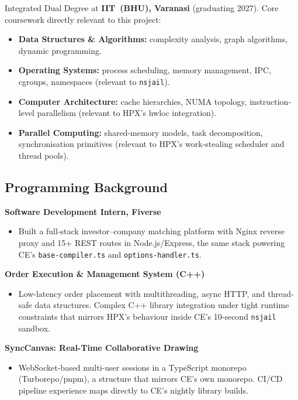 \documentclass[11pt, a4paper]{article}
\newcommand{\code}[1]{\texttt{#1}}
\newcommand{\cefile}[1]{\texttt{#1}}
\begin{document}
Integrated Dual Degree at \textbf{IIT~(BHU), Varanasi} (graduating 2027).
Core coursework directly relevant to this project:
\begin{itemize}[leftmargin=2em, itemsep=1pt]
  \item \textbf{Data Structures \& Algorithms:} complexity analysis,
        graph algorithms, dynamic programming.
  \item \textbf{Operating Systems:} process scheduling, memory management,
        IPC, cgroups, namespaces (relevant to \code{nsjail}).
  \item \textbf{Computer Architecture:} cache hierarchies, NUMA topology,
        instruction-level parallelism (relevant to HPX's hwloc integration).
  \item \textbf{Parallel Computing:} shared-memory models, task
        decomposition, synchronisation primitives (relevant to HPX's
        work-stealing scheduler and thread pools).
\end{itemize}

\subsection*{Programming Background}

\textbf{Software Development Intern, Fiverse}
\begin{itemize}[leftmargin=2em, itemsep=2pt]
  \item Built a full-stack investor--company matching platform with Nginx
        reverse proxy and 15+ REST routes in Node.js/Express, the same
        stack powering CE's \cefile{base-compiler.ts} and
        \cefile{options-handler.ts}.
\end{itemize}

\textbf{Order Execution \& Management System (C++)}
\begin{itemize}[leftmargin=2em, itemsep=2pt]
  \item Low-latency order placement with multithreading, async HTTP,
        and thread-safe data structures. Complex C++ library integration
        under tight runtime constraints that mirrors HPX's behaviour inside
        CE's 10-second \code{nsjail} sandbox.
\end{itemize}

\textbf{SyncCanvas: Real-Time Collaborative Drawing}
\begin{itemize}[leftmargin=2em, itemsep=2pt]
  \item WebSocket-based multi-user sessions in a TypeScript monorepo
        (Turborepo/pnpm), a structure that mirrors CE's own monorepo.
        CI/CD pipeline experience maps directly to CE's nightly library
        builds.
\end{itemize}
\end{document}
